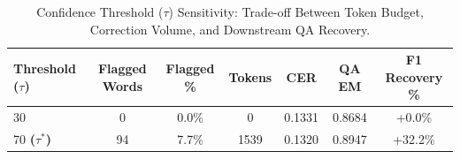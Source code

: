 \begin{table}[htbp]
\centering
\caption{Confidence Threshold ($\tau$) Sensitivity: Trade-off Between Token Budget, Correction Volume, and Downstream QA Recovery.}
\label{tab:threshold_sweep}
\begin{tabular}{lcccccc}
\toprule
\textbf{Threshold ($\tau$)} & \textbf{Flagged Words} & \textbf{Flagged \%} & \textbf{Tokens} & \textbf{CER} & \textbf{QA EM} & \textbf{F1 Recovery \%} \\
\midrule
30 & 0 & 0.0\% & 0 & 0.1331 & 0.8684 & +0.0\% \\
70 \textbf{($\tau^*$)} & 94 & 7.7\% & 1539 & 0.1320 & 0.8947 & +32.2\% \\
\bottomrule
\end{tabular}
\end{table}
